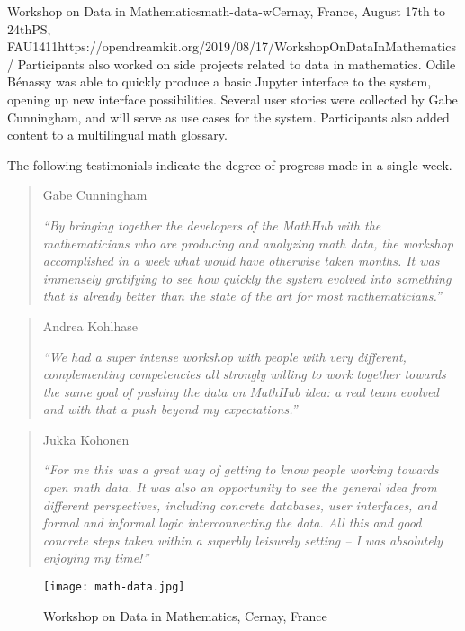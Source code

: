 \begin{event}{Workshop on Data in Mathematics}{math-data-w}{Cernay, France, August 17th to 24th}{PS, FAU}{14}{11}{https://opendreamkit.org/2019/08/17/WorkshopOnDataInMathematics/}
Participants also worked on side projects related to data in mathematics.
Odile Bénassy was able to quickly produce a basic Jupyter interface to the system,
opening up new interface possibilities.
Several user stories were collected by Gabe Cunningham, and will serve as use cases for the system.
Participants also added content to a multilingual math glossary.

The following testimonials indicate the degree of progress made in a single week.

\begin{quote}
Gabe Cunningham

\emph{``By bringing together the developers of the MathHub with the mathematicians who are producing and analyzing math data, the workshop accomplished in a week what would have otherwise taken months. It was immensely gratifying to see how quickly the system evolved into something that is already better than the state of the art for most mathematicians.''}
\end{quote}
\vspace{5mm}

\begin{quote}
Andrea Kohlhase

\emph{``We had a super intense workshop with people with very different, complementing competencies all strongly willing to work together towards the same goal of pushing the data on MathHub idea: a real team evolved and with that a push beyond my expectations.''}
\end{quote}
\vspace{5mm}

\begin{quote}
Jukka Kohonen

\emph{``For me this was a great way of getting to know people working towards open math data. It was also an opportunity to see the general idea from different perspectives, including concrete databases, user interfaces, and formal and informal logic interconnecting the data. All this and good concrete steps taken within a superbly leisurely setting -- I was absolutely enjoying my time!''}
\end{quote}


\begin{figure}[ht]
  \texttt{[image: math-data.jpg]}
  \caption*{Workshop on Data in Mathematics, Cernay, France}
\end{figure}

\end{event}
